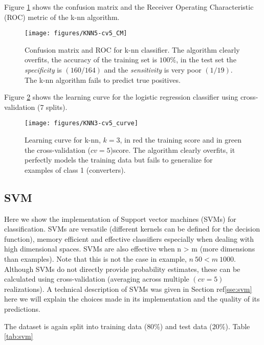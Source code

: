 \documentclass[11pt]{article}
\theoremstyle{definition}
\theoremstyle{remark}
\begin{document}
Figure \ref{fig:knn-cm} shows the confusion matrix and the Receiver Operating Characteristic (ROC) metric of the k-nn algorithm. 

\begin{figure}[H]
        \centering
        \texttt{[image: figures/KNN5-cv5\_CM]}
        \caption{Confusion matrix and ROC for k-nn classifier. The algorithm clearly overfits, the accuracy of the training set is $100\%$, in the test set the \emph{specificity} is $(160/164)$ and the \emph{sensitivity} is very poor $(1/19)$. The k-nn algorithm fails to predict true positives.
        }
\label{fig:knn-cm}
\end{figure}

Figure \ref{fig:knn-cv3} shows the learning curve for the logistic regression classifier using cross-validation (7 splits).
\begin{figure}[H]
        \centering
        \texttt{[image: figures/KNN3-cv5\_curve]}
        \caption{Learning curve for k-nn, $k=3$, in red the training score and in green the cross-validation ($cv=5$)score. The algorithm clearly overfits, it perfectly models the training data but fails to generalize for examples of class 1 (converters).
        } \label{fig:knn-cv3}
\end{figure}


\subsection{SVM}
\label{se:ressvm}
Here we show the implementation of Support vector machines (SVMs) for classification. SVMs are versatile (different kernels can be defined for the decision function), memory efficient and effective classifiers especially when dealing with high dimensional spaces. SVMs are also effective when n > m (more dimensions than examples). Note that this is not the case in example, $n~50 < m ~1000$.
Although SVMs do not directly provide probability estimates, these can be calculated using cross-validation (averaging across multiple $(cv=5)$ realizations).
A technical description of SVMs was given in Section ref\ref{sse:svm} here we will explain the choices made in its implementation and the quality of its predictions.

The dataset is again split into training data ($80\%$) and test data ($20\%$). Table \ref{tab:svm}
\end{document}
